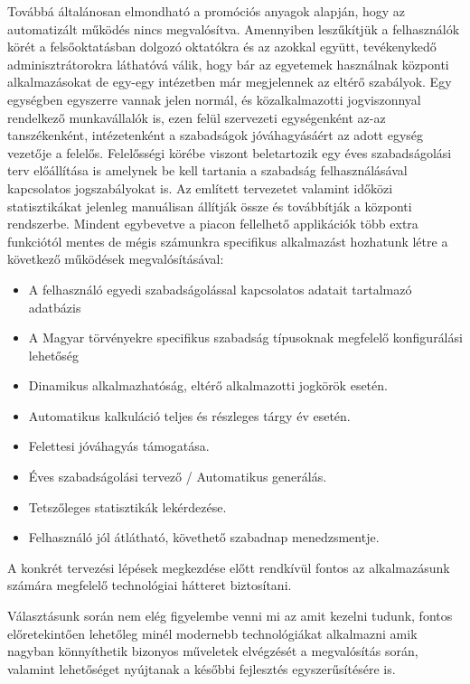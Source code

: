 Továbbá általánosan elmondható a promóciós anyagok alapján, hogy az automatizált működés nincs megvalósítva.
\vskip 0.2in
Amennyiben leszűkítjük a felhasználók körét a felsőoktatásban dolgozó oktatókra és az azokkal együtt, tevékenykedő adminisztrátorokra láthatóvá válik, hogy bár az egyetemek használnak központi alkalmazásokat de egy-egy intézetben már megjelennek az eltérő szabályok. Egy egységben egyszerre vannak jelen normál, és közalkalmazotti jogviszonnyal rendelkező munkavállalók is, ezen felül szervezeti egységenként az-az tanszékenként, intézetenként a szabadságok jóváhagyásáért az adott egység vezetője a felelős. Felelősségi körébe viszont beletartozik egy éves szabadságolási terv előállítása is amelynek be kell tartania a szabadság felhasználásával kapcsolatos jogszabályokat is. Az említett tervezetet valamint időközi statisztikákat jelenleg manuálisan állítják össze és továbbítják a központi rendszerbe.
\vskip 0.2in
Mindent egybevetve a piacon fellelhető applikációk több extra funkciótól mentes de mégis számunkra specifikus alkalmazást hozhatunk létre a következő működések megvalósításával:

\begin{itemize}
	\item A felhasználó egyedi szabadságolással kapcsolatos adatait tartalmazó adatbázis
	\item A Magyar törvényekre specifikus szabadság típusoknak megfelelő konfigurálási lehetőség
	\item Dinamikus alkalmazhatóság, eltérő alkalmazotti jogkörök esetén.
	\item Automatikus kalkuláció teljes és részleges tárgy év esetén.
	\item Felettesi jóváhagyás támogatása.
	\item Éves szabadságolási tervező / Automatikus generálás.
	\item Tetszőleges statisztikák lekérdezése.
	\item Felhasználó jól átlátható, követhető szabadnap menedzsmentje.
\end{itemize}


A konkrét tervezési lépések megkezdése előtt rendkívül fontos az alkalmazásunk számára megfelelő technológiai hátteret biztosítani.

Választásunk során nem elég figyelembe venni mi az amit kezelni tudunk, fontos előretekintően lehetőleg minél modernebb technológiákat alkalmazni amik nagyban könnyíthetik bizonyos műveletek elvégzését a megvalósítás során, valamint lehetőséget nyújtanak a későbbi fejlesztés egyszerűsítésére is.

